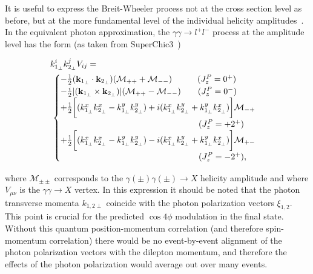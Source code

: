\documentclass[twocolumn,epjc3]{svjour3}\sloppy
\begin{document}

It is useful to express the Breit-Wheeler process not at the cross section level as before, but at the more fundamental level of the individual helicity amplitudes~\cite{DISPERSIONRELATIONLIGHT,budnev_two-photon_1975,brodsky_two-photon_1971}. 
In the equivalent photon approximation, the $\gamma\gamma \rightarrow l^+l^-$ process at the amplitude level has the form (as taken from SuperChic3~\cite{SuperChic3})

\begin{align}
    \begin{split}
  & k_{1_\perp}^i k_{2_\perp}^j V_{ij} = \\
  & \,
  \begin{cases}     
    -\frac{1}{2} ({\bf k}_{1_\perp}\cdot {\bf k}_{2_\perp})(\mathcal{M}_{++}+\mathcal{M}_{--}) \quad\qquad (J^P_z=0^+)  \\ 
    -\frac{i}{2} |({\bf k}_{1_\perp}\times {\bf k}_{2_\perp})|(\mathcal{M}_{++}-\mathcal{M}_{--}) \qquad  (J^P_z=0^-) \\ 
    +\frac{1}{2}\bigg[(k_{1_\perp}^x k_{2_\perp}^x-k_{1_\perp}^y k_{2_\perp}^y) +i(k_{1_\perp}^x k_{2_\perp}^y+k_{1_\perp}^y k_{2_\perp}^x)\bigg]\mathcal{M}_{-+}  \\ 
    \qquad\qquad\qquad\qquad\qquad\qquad\qquad\qquad\  (J^P_z=+2^+)\\ 
    +\frac{1}{2}\bigg[(k_{1_\perp}^x k_{2_\perp}^x-k_{1_\perp}^y k_{2_\perp}^y) -i(k_{1_\perp}^x k_{2_\perp}^y+k_{1_\perp}^y k_{2_\perp}^x)\bigg]\mathcal{M}_{+-} \\ 
    \qquad\qquad\qquad\qquad\qquad\qquad\qquad\qquad\  (J^P_z=-2^+),     
  \end{cases}\label{Agen}
  \end{split}
\end{align}

where $\mathcal{M}_{\pm \pm}$ corresponds to the $\gamma(\pm) \gamma(\pm) \to X$ helicity amplitude and where $V_{\mu\nu}$ is the $\gamma\gamma \to X$ vertex. 
In this expression it should be noted that the photon transverse momenta $k_{1,2\perp}$ coincide with the photon polarization vectors $\xi_{1,2}$.  This point is crucial for the predicted $\cos4\phi$ modulation in the final state. Without this quantum position-momentum correlation (and therefore spin-momentum correlation) there would be no event-by-event alignment of the photon polarization vectors with the dilepton momentum, and therefore the effects of the photon polarization would average out over many events. 
\end{document}
